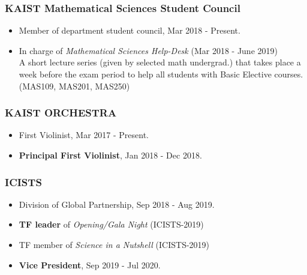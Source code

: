 \documentclass[10pt,a4]{article}
\begin{document}
\begin{small}
\subsubsection*{KAIST Mathematical Sciences Student Council}
\begin{itemize}
	\item Member of department student council, Mar 2018 - Present.
	
	\item In charge of {\it Mathematical Sciences Help-Desk} (Mar 2018 - June 2019) \\
	A short lecture series (given by selected math undergrad.) that takes place a week before the exam period to help all students with Basic Elective courses. (MAS109, MAS201, MAS250)
\end{itemize}


\subsubsection*{KAIST ORCHESTRA}
\begin{itemize}
	\item First Violinist, Mar 2017 - Present.
	
	\item {\bf Principal First Violinist}, Jan 2018 - Dec 2018.
	
\end{itemize}

\subsubsection*{ICISTS}
\begin{itemize}
	\item Division of Global Partnership, Sep 2018 - Aug 2019.
	
	\item {\bf TF leader} of {\it Opening/Gala Night} (ICISTS-2019)
	
	\item TF member of {\it Science in a Nutshell} (ICISTS-2019)
	
	\item {\bf Vice President}, Sep 2019 - Jul 2020.
	
	
\end{itemize}

%	

\newpage
\pagestyle{fancy}
\lhead{\textcolor{gray}{\it Junghyun Lee}}
\fancyfoot[C]{}


\end{small}
\end{document}
